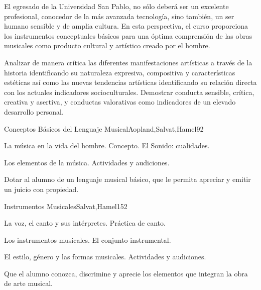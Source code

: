 \begin{syllabus}


\begin{justification}
El egresado de la Universidad San Pablo, no sólo deberá ser un excelente profesional, conocedor de la más avanzada tecnología, sino también, un ser humano sensible y de amplia cultura. En esta perspectiva, el curso proporciona los instrumentos conceptuales básicos para una óptima comprensión de las obras musicales como producto cultural y artístico creado por el hombre.
\end{justification}

\begin{goals}
\item Analizar de manera crítica las diferentes manifestaciones artísticas a través de la historia identificando su naturaleza expresiva, compositiva y características estéticas así como las nuevas tendencias artísticas identificando su relación directa con los actuales indicadores socioculturales. Demostrar conducta sensible, crítica, creativa y asertiva, y conductas valorativas como indicadores de un elevado desarrollo personal.
\end{goals}

\begin{outcomes}
\end{outcomes}

\begin{unit}{Conceptos Básicos del Lenguaje Musical}{Aopland,Salvat,Hamel}{9}{2}
\begin{topics}
	\item La música en la vida del hombre. Concepto. El Sonido: cualidades.
	\item Los elementos de la música. Actividades y audiciones.
\end{topics}
\begin{learningoutcomes}
	\item Dotar al alumno de un lenguaje musical básico, que le permita apreciar y emitir un juicio con propiedad.
\end{learningoutcomes}
\end{unit}

\begin{unit}{Instrumentos Musicales}{Salvat,Hamel}{15}{2}
\begin{topics}
	\item La voz, el canto y sus intérpretes. Práctica de canto.
	\item Los instrumentos musicales. El conjunto instrumental.
	\item El estilo, género y las formas musicales. Actividades y audiciones.
\end{topics}
\begin{learningoutcomes}
	\item Que el alumno conozca, discrimine y aprecie los elementos que integran la obra de arte musical.
\end{learningoutcomes}
\end{unit}


\end{syllabus}

